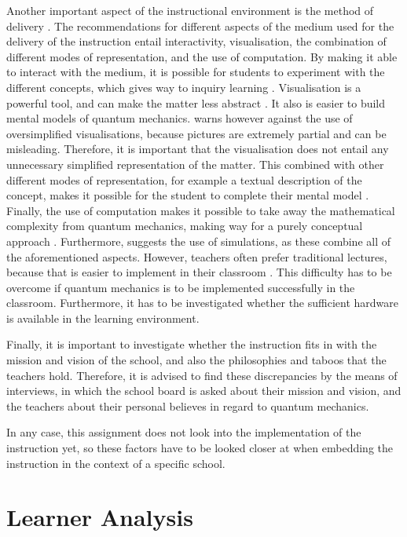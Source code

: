 \documentclass[11pt,twoside]{report} %
\begin{document}
Another important aspect of the instructional environment is the method of delivery \cite{smithragan}. The recommendations for different aspects of the medium used for the delivery of the instruction entail interactivity, visualisation, the combination of different modes of representation, and the use of computation. By making it able to interact with the medium, it is possible for students to experiment with the different concepts, which gives way to inquiry learning \cite{adegoke, asikainen, dori, mckagan}. Visualisation is a powerful tool, and can make the matter less abstract \cite{dori, henriksen, mckagan}. It also is easier to build mental models of quantum mechanics.  warns however against the use of oversimplified visualisations, because pictures are extremely partial and can be misleading. Therefore, it is important that the visualisation does not entail any unnecessary simplified representation of the matter. This combined with other different modes of representation, for example a textual description of the concept, makes it possible for the student to complete their mental model \cite{dori}. Finally, the use of computation makes it possible to take away the mathematical complexity from quantum mechanics, making way for a purely conceptual approach \cite{barnes, mckagan, velentzas}. Furthermore,  suggests the use of simulations, as these combine all of the aforementioned aspects. However, teachers often prefer traditional lectures, because that is easier to implement in their classroom \cite{adegoke}. This difficulty has to be overcome if quantum mechanics is to be implemented successfully in the classroom. Furthermore, it has to be investigated whether the sufficient hardware is available in the learning environment.

Finally, it is important to investigate whether the instruction fits in with the mission and vision of the school, and also the philosophies and taboos that the teachers hold. Therefore, it is advised to find these discrepancies by the means of interviews, in which the school board is asked about their mission and vision, and the teachers about their personal believes in regard to quantum mechanics.

In any case, this assignment does not look into the implementation of the instruction yet, so these factors have to be looked closer at when embedding the instruction in the context of a specific school.


\section{Learner Analysis}
\end{document}
